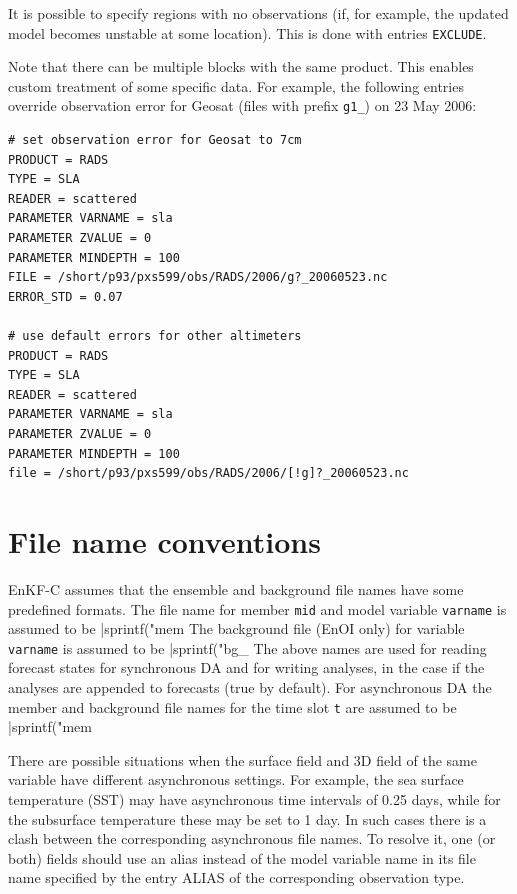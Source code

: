 \documentclass[11pt]{report}
\begin{document}
It is possible to specify regions with no observations (if, for example, the updated model becomes unstable at some location).
This is done with entries \verb|EXCLUDE|.

Note that there can be multiple blocks with the same product.
This enables custom treatment of some specific data.
For example, the following entries override observation error for Geosat (files with prefix \verb|g1_|) on 23 May 2006:
\begin{Verbatim}[frame=single,fontsize=\footnotesize]
# set observation error for Geosat to 7cm
PRODUCT = RADS
TYPE = SLA
READER = scattered
PARAMETER VARNAME = sla
PARAMETER ZVALUE = 0
PARAMETER MINDEPTH = 100
FILE = /short/p93/pxs599/obs/RADS/2006/g?_20060523.nc
ERROR_STD = 0.07

# use default errors for other altimeters
PRODUCT = RADS
TYPE = SLA
READER = scattered
PARAMETER VARNAME = sla
PARAMETER ZVALUE = 0
PARAMETER MINDEPTH = 100
file = /short/p93/pxs599/obs/RADS/2006/[!g]?_20060523.nc
\end{Verbatim}

\section{File name conventions}
\label{sec:filenames}

EnKF-C assumes that the ensemble and background file names have some predefined formats.
The file name for member \verb|mid| and model variable \verb|varname| is assumed to be \spverb|sprintf("mem%
The background file (EnOI only) for variable \verb|varname| is assumed to be \spverb|sprintf("bg_%
The above names are used for reading forecast states for synchronous DA and for writing analyses, in the case if the analyses are appended to forecasts (true by default).
For asynchronous DA the member and background file names for the time slot \verb|t| are assumed to be \spverb|sprintf("mem%

There are possible situations when the surface field and 3D field of the same variable have different asynchronous settings.
For example, the sea surface temperature (SST) may have asynchronous time intervals of 0.25 days, while for the subsurface temperature these may be set to 1 day.
In such cases there is a clash between the corresponding asynchronous file names.
To resolve it, one (or both) fields should use an alias instead of the model variable name in its file name specified by the entry ALIAS of the corresponding observation type.
\end{document}

